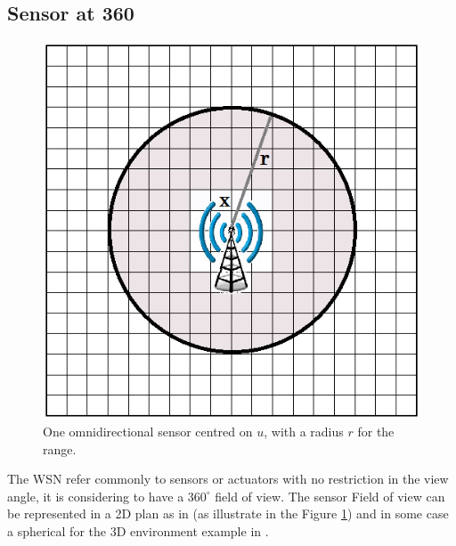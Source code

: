 \subsection{Sensor at 360}
%
	\begin{figure}[t!]
	\center
{}
   \includegraphics[width=\linewidth]{img/WsnSensor1.png}
  \caption{ One omnidirectional sensor centred on $u$, with a radius $r$ for the range.}\label{fig:WsnSensor1}
  \endminipage\hfill
\end{figure}

The WSN refer commonly to sensors or actuators  with no restriction in the view angle, it is considering to have a $360^\circ$ field of view. The sensor Field of view can be represented in a 2D plan  as in \cite{200*kulkarni2011, 174*zhang2016,150*chakrabarty2002} (as illustrate in the Figure \ref{fig:WsnSensor1}) and in some case a spherical for the 3D environment example in \cite{175*medhi2013,59*wang2008}.  

